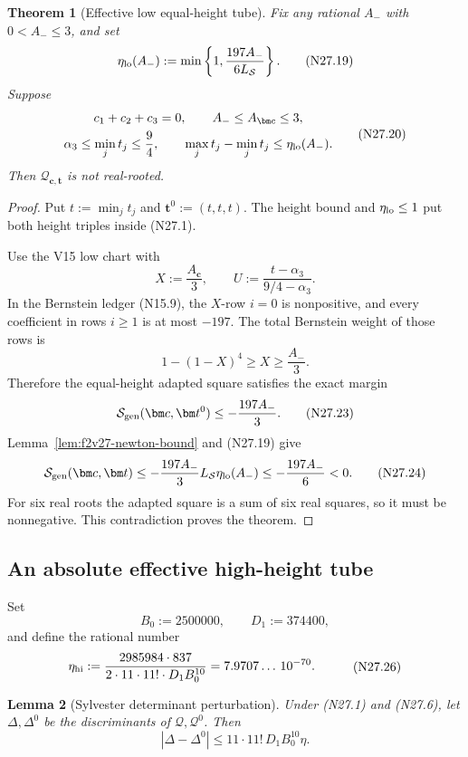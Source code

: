 \documentclass[11pt]{article}
\newtheorem{theorem}{Theorem}[section]
\newtheorem{lemma}[theorem]{Lemma}
\theoremstyle{definition}
\theoremstyle{remark}
\begin{document}
\begin{theorem}[Effective low equal-height tube]
\label{thm:f2v27-low-tube}
Fix any rational \(A_-\) with \(0<A_-\leq3\), and set
\[
 \eta_{\rm lo}(A_-)
 :=\min\left\{1,\frac{197A_-}{6L_{\mathcal S}}\right\}.
 \tag{N27.19}
\]
Suppose
\[
\begin{gathered}
 c_1+c_2+c_3=0,\qquad
 A_-\leq A_{\bm c}\leq3,\\
 \alpha_3\leq\min_jt_j\leq\frac94,\qquad
 \max_jt_j-\min_jt_j\leq\eta_{\rm lo}(A_-).
\end{gathered}
\tag{N27.20}
\]
Then \(\mathcal Q_{\bm c,\bm t}\) is not real-rooted.
\end{theorem}

\begin{proof}
Put \(t:=\min_jt_j\) and
\(\bm t^0:=(t,t,t)\).  The height bound and
\(\eta_{\rm lo}\leq1\) put both height triples inside
\textup{(N27.1)}.

Use the V15 low chart with
\[
 X:=\frac{A_{\bm c}}3,\qquad
 U:=\frac{t-\alpha_3}{9/4-\alpha_3}.
 \tag{N27.21}
\]
In the Bernstein ledger \textup{(N15.9)}, the \(X\)-row \(i=0\) is
nonpositive, and every coefficient in rows \(i\geq1\) is at most
\(-197\).  The total Bernstein weight of those rows is
\[
 1-(1-X)^4\geq X\geq\frac{A_-}{3}.
 \tag{N27.22}
\]
Therefore the equal-height adapted square satisfies the exact margin
\[
 \mathcal S_{\rm gen}(\bm c,\bm t^0)
 \leq-\frac{197A_-}{3}.
 \tag{N27.23}
\]
Lemma~\ref{lem:f2v27-newton-bound} and
\textup{(N27.19)} give
\[
 \mathcal S_{\rm gen}(\bm c,\bm t)
 \leq-\frac{197A_-}{3}
       L_{\mathcal S}\eta_{\rm lo}(A_-)
 \leq-\frac{197A_-}{6}<0.
 \tag{N27.24}
\]
For six real roots the adapted square is a sum of six real squares, so it
must be nonnegative.  This contradiction proves the theorem.
\end{proof}

\subsection{An absolute effective high-height tube}
\label{subsec:f2v27-high}

Set
\[
 B_0:=2500000,\qquad D_1:=374400,
 \tag{N27.25}
\]
and define the rational number
\[
\begin{aligned}
 \eta_{\rm hi}
 &:=\frac{2985984\cdot837}
 {2\cdot11\cdot11!\cdot D_1 B_0^{10}}
 =7.9707\ldots\,10^{-70}.
\end{aligned}
\tag{N27.26}
\]

\begin{lemma}[Sylvester determinant perturbation]
\label{lem:f2v27-sylvester}
Under \textup{(N27.1)} and \textup{(N27.6)}, let
\(\Delta,\Delta^0\) be the discriminants of
\(\mathcal Q,\mathcal Q^0\).  Then
\[
 |\Delta-\Delta^0|
 \leq11\cdot11!\,D_1B_0^{10}\eta.
 \tag{N27.27}
\]
\end{lemma}
\end{document}
